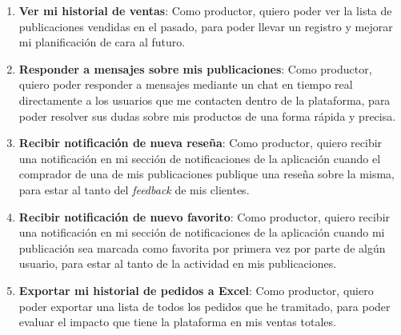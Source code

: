 \begin{enumerate}[label=HU-\protect\twodigits{\arabic*}:, align=left, leftmargin=*]
\item \textbf{Ver mi historial de ventas}: Como productor, quiero poder ver la lista de publicaciones vendidas en el pasado, para poder llevar un registro y mejorar mi planificación de cara al futuro.

\item \textbf{Responder a mensajes sobre mis publicaciones}: Como productor, quiero poder responder a mensajes mediante un chat en tiempo real directamente a los usuarios que me contacten dentro de la plataforma, para poder resolver sus dudas sobre mis productos de una forma rápida y precisa.

\item \textbf{Recibir notificación de nueva reseña}: Como productor, quiero recibir una notificación en mi sección de notificaciones de la aplicación cuando el comprador de una de mis publicaciones publique una reseña sobre la misma, para estar al tanto del \textit{feedback} de mis clientes.

\item \textbf{Recibir notificación de nuevo favorito}: Como productor, quiero recibir una notificación en mi sección de notificaciones de la aplicación cuando mi publicación sea marcada como favorita por primera vez por parte de algún usuario, para estar al tanto de la actividad en mis publicaciones.

\item \textbf{Exportar mi historial de pedidos a Excel}: Como productor, quiero poder exportar una lista de todos los pedidos que he tramitado, para poder evaluar el impacto que tiene la plataforma en mis ventas totales.

\end{enumerate}